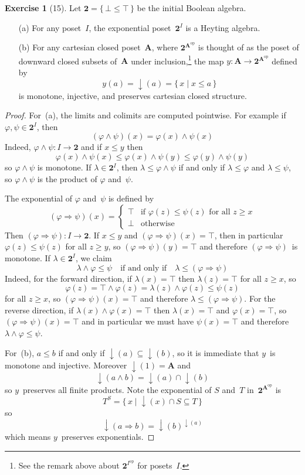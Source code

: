 \documentclass[letterpaper,12pt]{article}
\newcommand{\true}{\top}
\newcommand{\false}{\bot}
\newcommand{\ex}{\Rightarrow}
\newcommand{\sect}{\cap}
\newcommand{\meet}{\wedge}
\DeclareMathOperator{\down}{\downarrow}
\newcommand{\cat}[1]{\mathbf{#1}}
\newcommand{\dual}[1]{#1^{\mathrm{op}}}
\newcommand{\2}{\cat{2}}
\newcommand{\A}{\cat{A}}
\theoremstyle{definition}
\newtheorem*{exer}{Exercise}
\theoremstyle{remark}
\theoremstyle{direction}
\begin{document}
\begin{exer}[15]
Let \(\2=\{\,\false\le\true\,\}\) be the initial Boolean algebra.
\begin{enumerate}[itemsep=0pt]
\item[(a)] For any poset~\(I\), the exponential poset~\(\2^I\) is a Heyting algebra.
\item[(b)] For any cartesian closed poset~\(\A\), where \(\2^{\dual{\A}}\) is thought of as the poset of downward closed subsets of~\(\A\) under inclusion,\footnote{See the remark above about \(\2^{\dual{I}}\) for posets~\(I\).} the map \(y:\A\to\2^{\dual{\A}}\) defined by
\[y(a)=\down(a)=\{\,x\mid x\le a\,\}\]
is monotone, injective, and preserves cartesian closed structure.
\end{enumerate}
\end{exer}
\begin{proof}
For~(a), the limits and colimits are computed pointwise. For example if \(\varphi,\psi\in\2^I\), then
\[(\varphi\meet\psi)(x)=\varphi(x)\meet\psi(x)\]
Indeed, \(\varphi\meet\psi:I\to\2\) and if \(x\le y\) then
\[\varphi(x)\meet\psi(x)\le\varphi(x)\meet\psi(y)\le\varphi(y)\meet\psi(y)\]
so \(\varphi\meet\psi\) is monotone. If \(\lambda\in\2^I\), then \(\lambda\le\varphi\meet\psi\) if and only if \(\lambda\le\varphi\) and \(\lambda\le\psi\), so \(\varphi\meet\psi\) is the product of \(\varphi\) and~\(\psi\).

The exponential of \(\varphi\) and~\(\psi\) is defined by
\[(\varphi\ex\psi)(x)=\begin{cases}
\true&\text{if }\varphi(z)\le\psi(z)\text{ for all }z\ge x\\
\false&\text{otherwise}
\end{cases}\]
Then \((\varphi\ex\psi):I\to\2\). If \(x\le y\) and \((\varphi\ex\psi)(x)=\true\), then in particular \(\varphi(z)\le\psi(z)\) for all \(z\ge y\), so \((\varphi\ex\psi)(y)=\true\) and therefore \((\varphi\ex\psi)\)~is monotone. If \(\lambda\in\2^I\), we claim
\[\lambda\meet\varphi\le\psi\quad\text{if and only if}\quad\lambda\le(\varphi\ex\psi)\]
Indeed, for the forward direction, if \(\lambda(x)=\true\) then \(\lambda(z)=\true\) for all \(z\ge x\), so
\[\varphi(z)=\true\meet\varphi(z)=\lambda(z)\meet\varphi(z)\le\psi(z)\]
for all \(z\ge x\), so \((\varphi\ex\psi)(x)=\true\) and therefore \(\lambda\le(\varphi\ex\psi)\). For the reverse direction, if \(\lambda(x)\meet\varphi(x)=\true\) then \(\lambda(x)=\true\) and \(\varphi(x)=\true\), so \((\varphi\ex\psi)(x)=\true\) and in particular we must have \(\psi(x)=\true\) and therefore \(\lambda\meet\varphi\le\psi\).

For~(b), \(a\le b\) if and only if \(\down(a)\subseteq\down(b)\), so it is immediate that \(y\)~is monotone and injective. Moreover \(\down(1)=\A\) and
\[\down(a\meet b)=\down(a)\sect\down(b)\]
so \(y\)~preserves all finite products. Note the exponential of \(S\) and~\(T\) in~\(\2^{\dual{\A}}\) is
\[T^S=\{\,x\mid\down(x)\sect S\subseteq T\,\}\]
so
\[\down(a\ex b)=\down(b)^{\down(a)}\]
which means \(y\)~preserves exponentials.
\end{proof}
\end{document}

